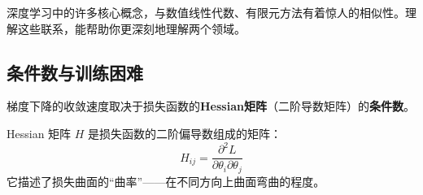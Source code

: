 
深度学习中的许多核心概念，与数值线性代数、有限元方法有着惊人的相似性。理解这些联系，能帮助你更深刻地理解两个领域。

\subsection*{条件数与训练困难}

梯度下降的收敛速度取决于损失函数的\textbf{Hessian矩阵}（二阶导数矩阵）的\textbf{条件数}。

\begin{definition}[Hessian 矩阵]
Hessian 矩阵 $H$ 是损失函数的二阶偏导数组成的矩阵：
\begin{equation}
H_{ij} = \frac{\partial^2 L}{\partial \theta_i \partial \theta_j}
\end{equation}
它描述了损失曲面的``曲率''——在不同方向上曲面弯曲的程度。
\end{definition}

